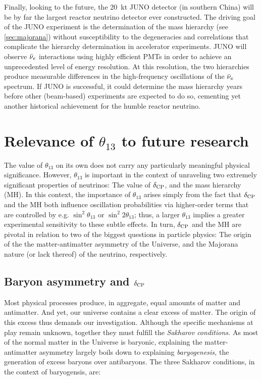 \documentclass[../thesis.tex]{subfiles}
\begin{document}
Finally, looking to the future, the 20~kt JUNO detector (in southern China) will be by far the largest reactor neutrino detector ever constructed. The driving goal of the JUNO experiment is the determination of the mass hierarchy (see \autoref{sec:majorana}) without susceptibility to the degeneracies and correlations that complicate the hierarchy determination in accelerator experiments. JUNO will observe $\bar\nu_e$ interactions using highly efficient PMTs in order to achieve an unprecedented level of energy resolution. At this resolution, the two hierarchies produce measurable differences in the high-frequency oscillations of the $\bar\nu_e$ spectrum. If JUNO is successful, it could determine the mass hierarchy years before other (beam-based) experiments are expected to do so, cementing yet another historical achievement for the humble reactor neutrino.

\section{Relevance of $\theta_{13}$ to future research}
\label{sec:futureRelevance}

The value of $\theta_{13}$ on its own does not carry any particularly meaningful physical significance. However, $\theta_{13}$ is important in the context of unraveling two extremely significant properties of neutrinos: The value of $\delta_\text{CP}$, and the mass hierarchy (MH). In this context, the importance of $\theta_{13}$ arises simply from the fact that $\delta_\text{CP}$ and the MH both influence oscillation probabilities via higher-order terms that are controlled by e.g. \(\sin^2\theta_{13}\) or \(\sin^2 2\theta_{13}\); thus, a larger $\theta_{13}$ implies a greater experimental sensitivity to these subtle effects. In turn, $\delta_\text{CP}$ and the MH are pivotal in relation to two of the biggest questions in particle physics: The origin of the the matter-antimatter asymmetry of the Universe, and the Majorana nature (or lack thereof) of the neutrino, respectively.

\subsection{Baryon asymmetry and $\delta_\text{CP}$}
\label{sec:baryonAsym}

Most physical processes produce, in aggregate, equal amounts of matter and antimatter. And yet, our universe contains a clear excess of matter. The origin of this excess thus demands our investigation. Although the specific mechanisms at play remain unknown, together they must fulfill the \emph{Sakharov conditions.} As most of the normal matter in the Universe is baryonic, explaining the matter-antimatter asymmetry largely boils down to explaining \emph{baryogenesis,} the generation of excess baryons over antibaryons. The three Sakharov conditions, in the context of baryogensis, are:
\end{document}
